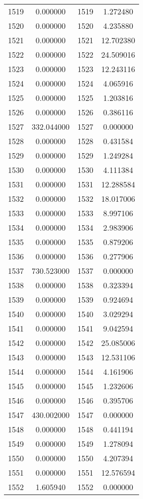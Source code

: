 \documentclass[12pt]{article}
\begin{document}
\begin{longtable}{@{}cccc@{}}
1519 & 0.000000 & 1519 & 1.272480 \\
1520 & 0.000000 & 1520 & 4.235880 \\
1521 & 0.000000 & 1521 & 12.702380 \\
1522 & 0.000000 & 1522 & 24.509016 \\
1523 & 0.000000 & 1523 & 12.243116 \\
1524 & 0.000000 & 1524 & 4.065916 \\
1525 & 0.000000 & 1525 & 1.203816 \\
1526 & 0.000000 & 1526 & 0.386116 \\
1527 & 332.044000 & 1527 & 0.000000 \\
1528 & 0.000000 & 1528 & 0.431584 \\
1529 & 0.000000 & 1529 & 1.249284 \\
1530 & 0.000000 & 1530 & 4.111384 \\
1531 & 0.000000 & 1531 & 12.288584 \\
1532 & 0.000000 & 1532 & 18.017006 \\
1533 & 0.000000 & 1533 & 8.997106 \\
1534 & 0.000000 & 1534 & 2.983906 \\
1535 & 0.000000 & 1535 & 0.879206 \\
1536 & 0.000000 & 1536 & 0.277906 \\
1537 & 730.523000 & 1537 & 0.000000 \\
1538 & 0.000000 & 1538 & 0.323394 \\
1539 & 0.000000 & 1539 & 0.924694 \\
1540 & 0.000000 & 1540 & 3.029294 \\
1541 & 0.000000 & 1541 & 9.042594 \\
1542 & 0.000000 & 1542 & 25.085006 \\
1543 & 0.000000 & 1543 & 12.531106 \\
1544 & 0.000000 & 1544 & 4.161906 \\
1545 & 0.000000 & 1545 & 1.232606 \\
1546 & 0.000000 & 1546 & 0.395706 \\
1547 & 430.002000 & 1547 & 0.000000 \\
1548 & 0.000000 & 1548 & 0.441194 \\
1549 & 0.000000 & 1549 & 1.278094 \\
1550 & 0.000000 & 1550 & 4.207394 \\
1551 & 0.000000 & 1551 & 12.576594 \\
1552 & 1.605940 & 1552 & 0.000000 \\

\end{longtable}
\end{document}
